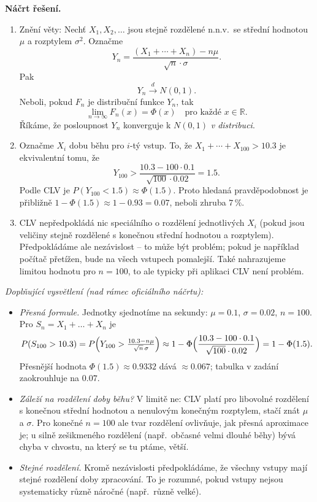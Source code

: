 \medskip
\noindent\textbf{Náčrt řešení.}\par
\begin{enumerate}
  \item Znění věty: Nechť $X_1, X_2, \dots$ jsou stejně rozdělené n.n.v.\ se střední hodnotou
    $\mu$ a rozptylem $\sigma^2$. Označme
    \[
      Y_n = \frac{(X_1 + \cdots + X_n) - n\mu}{\sqrt{n}\cdot\sigma}.
    \]
    Pak
    \[
      Y_n \xrightarrow{\,d\,} N(0,1).
    \]
    Neboli, pokud $F_n$ je distribuční funkce $Y_n$, tak
    \[
      \lim_{n\to\infty} F_n(x) = \Phi(x) \quad \text{pro každé } x \in \mathbb{R}.
    \]
    Říkáme, že posloupnost $Y_n$ konverguje k $N(0,1)$ \textit{v distribuci}.

  \item Označme $X_i$ dobu běhu pro $i$-tý vstup. To, že $X_1 + \cdots + X_{100} > 10.3$ je
    ekvivalentní tomu, že
    \[
      Y_{100} > \frac{10.3 - 100\cdot 0.1}{\sqrt{100}\cdot 0.02} = 1.5.
    \]
    Podle CLV je $P(Y_{100} < 1.5) \approx \Phi(1.5)$. Proto hledaná pravděpodobnost je
    přibližně $1 - \Phi(1.5) \approx 1 - 0.93 = 0.07$, neboli zhruba $7\,\%$.

  \item CLV nepředpokládá nic speciálního o rozdělení jednotlivých $X_i$ (pokud jsou veličiny
    stejně rozdělené s konečnou střední hodnotou a rozptylem). Předpokládáme ale nezávislost --
    to může být problém; pokud je například počítač přetížen, bude na všech vstupech pomalejší.
    Také nahrazujeme limitou hodnotu pro $n = 100$, to ale typicky při aplikaci CLV není problém.
\end{enumerate}

\medskip
\noindent\textit{Doplňující vysvětlení (nad rámec oficiálního náčrtu):}
\begin{itemize}
  \item \emph{Přesná formule.} Jednotky sjednotíme na sekundy: $\mu=0.1$, $\sigma=0.02$, $n=100$. Pro $S_n=X_1+\dots+X_n$ je
    \[
      P(S_{100}>10.3)=P\Bigl(Y_{100}>\tfrac{10.3-n\mu}{\sqrt n\,\sigma}\Bigr)\approx 1-\Phi\Bigl(\frac{10.3-100\cdot 0.1}{\sqrt{100}\cdot 0.02}\Bigr)=1-\Phi(1.5).
    \]
    Přesnější hodnota $\Phi(1.5)\approx 0.9332$ dává $\approx 0.067$; tabulka v zadání zaokrouhluje na $0.07$.
  \item \emph{Záleží na rozdělení doby běhu?} V limitě ne: CLV platí pro libovolné rozdělení s konečnou střední hodnotou a nenulovým konečným rozptylem, stačí znát $\mu$ a $\sigma$. Pro konečné $n=100$ ale tvar rozdělení ovlivňuje, jak přesná aproximace je; u silně zešikmeného rozdělení (např.\ občasné velmi dlouhé běhy) bývá chyba v chvostu, na který se tu ptáme, větší.
  \item \emph{Stejné rozdělení.} Kromě nezávislosti předpokládáme, že všechny vstupy mají stejné rozdělení doby zpracování. To je rozumné, pokud vstupy nejsou systematicky různě náročné (např.\ různě velké).
\end{itemize}
